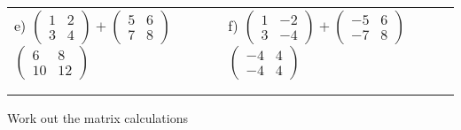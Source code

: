 \documentclass[fontsize=12pt]{scrartcl}
\begin{document}
\begin{tabular}{p{9cm}p{9cm}}
e) $\begin{pmatrix}1&2\\3&4 \end{pmatrix}+\begin{pmatrix}5&6\\7&8 \end{pmatrix}$
 \quad $\begin{pmatrix}6&8\\10&12\end{pmatrix}$
&f) $\begin{pmatrix}1&-2\\3&-4 \end{pmatrix}+\begin{pmatrix}-5&6\\-7&8 \end{pmatrix}$
 \quad $\begin{pmatrix}-4&4\\-4&4\end{pmatrix}$
\\\\\\
\end{tabular}
\newpage
Work out the matrix calculations
\newline
\newline
\end{document}
